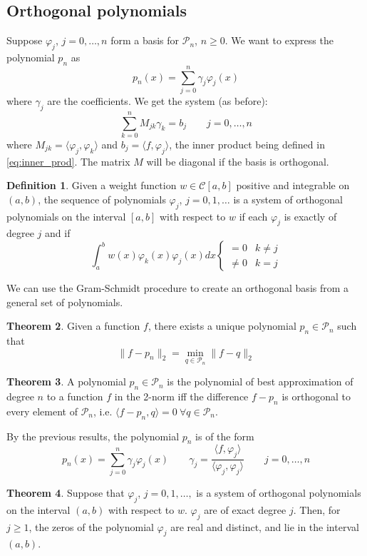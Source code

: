\documentclass[12pt, openany]{report}
\theoremstyle{definition}
\newtheorem{thm}{Theorem}[chapter]
\newtheorem{definition}[thm]{Definition}
\begin{document}
\subsection{Orthogonal polynomials}
Suppose $\varphi_j$, $j=0,\dots,n$ form a basis for $\mathcal{P}_n$, $n\ge0$. We want to express the polynomial $p_n$ as 
\begin{equation}
    p_n(x) = \sum_{j=0}^n \gamma_j\varphi_j(x)
\end{equation}
where $\gamma_j$ are the coefficients. We get the system (as before):
\begin{equation}
    \sum_{k=0}^n M_{jk}\gamma_k = b_j \qquad j=0,\dots,n
\end{equation}
where $M_{jk} = \langle \varphi_j,\varphi_k\rangle$ and $b_j = \langle f,\varphi_j\rangle$, the inner product being defined in \eqref{eq:inner_prod}. The matrix $M$ will be diagonal if the basis is orthogonal. 
\begin{definition}
    Given a weight function $w\in \mathcal{C}[a,b]$ positive and integrable on $(a,b)$, the sequence of polynomials $\varphi_j$, $j=0,1,\dots$ is a system of orthogonal polynomials on the interval $[a,b]$ with respect to $w$ if each $\varphi_j$ is exactly of degree $j$ and if 
    \begin{equation}
        \int_a^b w(x)\varphi_k(x)\varphi_j(x) dx \begin{cases}
            = 0 & k\neq j\\
            \neq 0 & k=j
        \end{cases}
    \end{equation}
\end{definition}
We can use the Gram-Schmidt procedure to create an orthogonal basis from a general set of polynomials. 
\begin{thm}
    Given a function $f$, there exists a unique polynomial $p_n\in \mathcal{P}_n$ such that
    \begin{equation}
        \lVert f-p_n\rVert_2 = \min_{q\in \mathcal{P}_n} \lVert f-q\rVert_2
    \end{equation}
\end{thm}
\begin{thm}
    A polynomial $p_n\in \mathcal{P}_n$ is the polynomial of best approximation of degree $n$ to a function $f$ in the 2-norm iff the difference $f-p_n$ is orthogonal to every element of $\mathcal{P}_n$, i.e. $\langle f-p_n,q\rangle = 0\:\forall q\in \mathcal{P}_n$. 
\end{thm}
By the previous results, the polynomial $p_n$ is of the form 
\begin{equation}
    p_n(x) = \sum_{j=0}^n \gamma_j\varphi_j(x) \qquad \gamma_j = \frac{\langle f,\varphi_j\rangle}{\langle \varphi_j,\varphi_j\rangle} \qquad j=0,\dots,n
\end{equation}
\begin{thm}
    Suppose that $\varphi_j$, $j=0,1,\dots,$ is a system of orthogonal polynomials on the interval $(a,b)$ with respect to $w$. $\varphi_j$ are of exact degree $j$. Then, for $j\ge1$, the zeros of the polynomial $\varphi_j$ are real and distinct, and lie in the interval $(a,b)$.
\end{thm}
\end{document}
